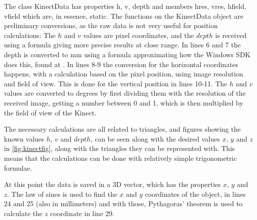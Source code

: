 

The class KinectData has properties h, v, depth and members hres, vres, hfield, vfield which are, in essence, static.
The functions on the KinectData object are preliminary conversions,
as the raw data is not very useful for position calculations: The $h$ and $v$ values are pixel coordinates, and the $depth$
is received using a formula giving more precise results at close range. 
In lines 6 and 7 the depth is converted to mm using a formula approximating how the Windows SDK does this, found at \cite{depthconversion}. 
In lines 8-9 the conversion for the horizontal coordinates happens, with a calculation based on the pixel position, using image resolution and field of view. This is done for the vertical position in lines 10-11. The $h$ and $v$ values are converted to degrees by first dividing them with the resolution of the received image, getting
a number between 0 and 1, which is then multiplied by the field of view of the Kinect.

The necessary calculations are all related to triangles, and figures showing the known values $h$, $v$ and $depth$,
can be seen along with the desired values $x$, $y$ and $z$ in \autoref{fig:kinectfig},
along with the triangles they can be represented with. This means that the calculations can be done with relatively
simple trigonometric formulae.

At this point the data is saved in a 3D vector, which has the properties  $x$, $y$ and $z$. The law of sines is used to find the $x$ and $y$ coordinates of the object, in lines 24 and 25 (also in
millimeters) and with those, Pythagoras' theorem is used to calculate the $z$ coordinate in line 29.


